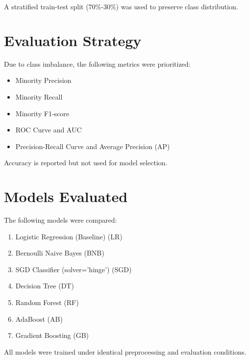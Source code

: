 \documentclass[12pt]{article}
\begin{document}
	A stratified train-test split (70\%-30\%) was used to preserve class distribution.
	
	\section{Evaluation Strategy}
	
	Due to class imbalance, the following metrics were prioritized:
	
	\begin{itemize}
		\item Minority Precision
		\item Minority Recall
		\item Minority F1-score
		\item ROC Curve and AUC
		\item Precision-Recall Curve and Average Precision (AP)
	\end{itemize}
	
	Accuracy is reported but not used for model selection.
	
	\section{Models Evaluated}
	
	The following models were compared:
	
	\begin{enumerate}
		\item Logistic Regression (Baseline) (LR)
		\item Bernoulli Naive Bayes (BNB)
		\item SGD Classifier (solver='hinge') (SGD)
		\item Decision Tree (DT)
		\item Random Forest (RF)
		\item AdaBoost (AB)
		\item Gradient Boosting (GB)
	\end{enumerate}
	
	All models were trained under identical preprocessing and evaluation conditions.
	
\end{document}
